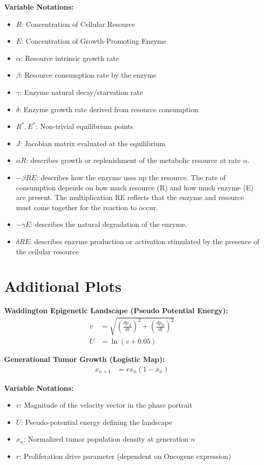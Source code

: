 \documentclass{article}
\begin{document}
\textbf{Variable Notations:}
\begin{itemize}
    \item $R$: Concentration of Cellular Resource 
    \item $E$: Concentration of Growth-Promoting Enzyme 
    \item $\alpha$: Resource intrinsic growth rate
    \item $\beta$: Resource consumption rate by the enzyme
    \item $\gamma$: Enzyme natural decay/starvation rate
    \item $\delta$: Enzyme growth rate derived from resource consumption
    \item $R^*, E^*$: Non-trivial equilibrium points
    \item $J$: Jacobian matrix evaluated at the equilibrium
    \item $\alpha R$: describes growth or replenishment of the metabolic resource at rate $\alpha$.
    \item $-\beta R E$: describes how the enzyme uses up the resource. The rate of consumption depends on how much resource (R) and how much enzyme (E) are present. The multiplication RE reflects that the enzyme and resource must come together for the reaction to occur.
    \item $-\gamma E$: describes the natural degradation of the enzyme.
    \item $\delta R E$: describes enzyme production or activation stimulated by the presence of the cellular resource
\end{itemize}

\section*{Additional Plots}

\textbf{Waddington Epigenetic Landscape (Pseudo Potential Energy):}
\begin{align}
    v &= \sqrt{\left(\frac{dp_A}{dt}\right)^2 + \left(\frac{dp_B}{dt}\right)^2} \\
    U &= \ln(v + 0.05)
\end{align}

\textbf{Generational Tumor Growth (Logistic Map):}
\begin{align}
    x_{n+1} &= r x_n (1 - x_n)
\end{align}

\textbf{Variable Notations:}
\begin{itemize}
    \item $v$: Magnitude of the velocity vector in the phase portrait
    \item $U$: Pseudo-potential energy defining the landscape
    \item $x_n$: Normalized tumor population density at generation $n$
    \item $r$: Proliferation drive parameter (dependent on Oncogene expression)
\end{itemize}
\end{document}
